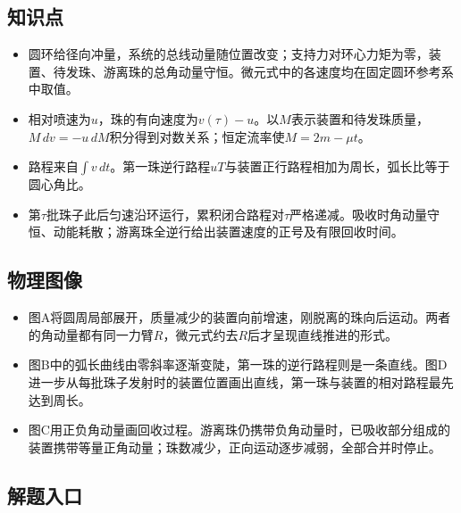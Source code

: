 \documentclass[UTF8,fontset=fandol,a4paper,11pt]{ctexart}
\begin{document}


\subsection*{知识点}

\begin{itemize}
\item 圆环给径向冲量，系统的总线动量随位置改变；支持力对环心力矩为零，装置、待发珠、游离珠的总角动量守恒。微元式中的各速度均在固定圆环参考系中取值。
\item 相对喷速为$u$，珠的有向速度为$v(\tau)-u$。以$M$表示装置和待发珠质量，$M\,dv=-u\,dM$积分得到对数关系；恒定流率使$M=2m-\mu t$。
\item 路程来自$\int v\,dt$。第一珠逆行路程$uT$与装置正行路程相加为周长，弧长比等于圆心角比。
\item 第$\tau$批珠子此后匀速沿环运行，累积闭合路程对$\tau$严格递减。吸收时角动量守恒、动能耗散；游离珠全逆行给出装置速度的正号及有限回收时间。
\end{itemize}



\subsection*{物理图像}

\begin{itemize}
\item 图A将圆周局部展开，质量减少的装置向前增速，刚脱离的珠向后运动。两者的角动量都有同一力臂$R$，微元式约去$R$后才呈现直线推进的形式。
\item 图B中的弧长曲线由零斜率逐渐变陡，第一珠的逆行路程则是一条直线。图D进一步从每批珠子发射时的装置位置画出直线，第一珠与装置的相对路程最先达到周长。
\item 图C用正负角动量画回收过程。游离珠仍携带负角动量时，已吸收部分组成的装置携带等量正角动量；珠数减少，正向运动逐步减弱，全部合并时停止。
\end{itemize}



\subsection*{解题入口}
\end{document}

